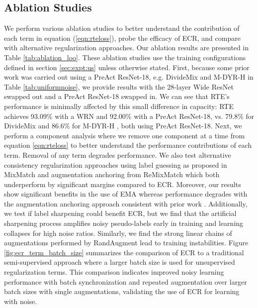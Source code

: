 \documentclass{article}
\begin{document}
\subsection{Ablation Studies}
\label{sec:ablation}
We perform various ablation studies to better understand the contribution of each term in equation (\ref{eqn:rteloss}), probe the efficacy of ECR, and compare with alternative regularization approaches.  Our ablation results are presented in Table \ref{tab:ablation_loo}.  These ablation studies use the training configurations defined in section \ref{sec:expt:us} unless otherwise stated.  First, because some prior work was carried out using a PreAct ResNet-18, e.g. DivideMix and M-DYR-H in Table \ref{tab:uniformnoise}, we provide results with the 28-layer Wide ResNet swapped out and a PreAct ResNet-18 swapped in. We can see that RTE's performance is minimally affected by this small difference in capacity: RTE achieves 93.09\% with a WRN and 92.00\% with a PreAct ResNet-18, vs. 79.8\% for DivideMix \cite{li2020} and 86.6\% for M-DYR-H \cite{arazo2019}, both using PreAct ResNet-18.  Next, we perform a component analysis where we remove one component at a time from equation \ref{eqn:rteloss} to better understand the performance contributions of each term. Removal of any term degrades performance.  We also test alternative consistency regularization approaches using label guessing as proposed in MixMatch \cite{48557} and augmentation anchoring from ReMixMatch \cite{Berthelot2020ReMixMatch:} which both underperform by significant margins compared to ECR.  Moreover, our results show significant benefits in the use of EMA whereas performance degrades with the augmentation anchoring approach consistent with prior work \cite{48557}.  Additionally, we test if label sharpening could benefit ECR, but we find that the artificial sharpening process amplifies noisy pseudo-labels early in training and learning collapses for high noise ratios.  Similarly, we find the strong linear chains of augmentations performed by RandAugment lead to training instabilities.  Figure \ref{fig:ecr_term_batch_size} summarizes the comparison of ECR to a traditional semi-supervised approach where a larger batch size is used for unsupervised regularization terms. This comparison indicates improved noisy learning performance with batch synchronization and repeated augmentation over larger batch sizes with single augmentations, validating the use of ECR for learning with noise.
\end{document}
